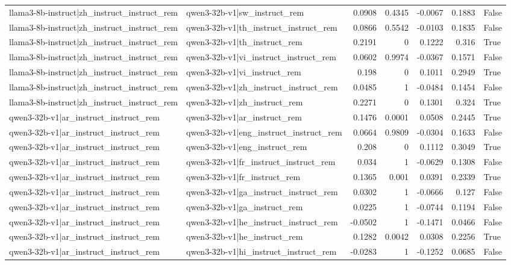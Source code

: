 \begin{table}
\begin{tabular}{l l r r r r l}
llama3-8b-instruct|zh_instruct_instruct_rem & qwen3-32b-v1|sw_instruct_rem & 0.0908 & 0.4345 & -0.0067 & 0.1883 & False \\
llama3-8b-instruct|zh_instruct_instruct_rem & qwen3-32b-v1|th_instruct_instruct_rem & 0.0866 & 0.5542 & -0.0103 & 0.1835 & False \\
llama3-8b-instruct|zh_instruct_instruct_rem & qwen3-32b-v1|th_instruct_rem & 0.2191 & 0 & 0.1222 & 0.316 & True \\
llama3-8b-instruct|zh_instruct_instruct_rem & qwen3-32b-v1|vi_instruct_instruct_rem & 0.0602 & 0.9974 & -0.0367 & 0.1571 & False \\
llama3-8b-instruct|zh_instruct_instruct_rem & qwen3-32b-v1|vi_instruct_rem & 0.198 & 0 & 0.1011 & 0.2949 & True \\
llama3-8b-instruct|zh_instruct_instruct_rem & qwen3-32b-v1|zh_instruct_instruct_rem & 0.0485 & 1 & -0.0484 & 0.1454 & False \\
llama3-8b-instruct|zh_instruct_instruct_rem & qwen3-32b-v1|zh_instruct_rem & 0.2271 & 0 & 0.1301 & 0.324 & True \\
qwen3-32b-v1|ar_instruct_instruct_rem & qwen3-32b-v1|ar_instruct_rem & 0.1476 & 0.0001 & 0.0508 & 0.2445 & True \\
qwen3-32b-v1|ar_instruct_instruct_rem & qwen3-32b-v1|eng_instruct_instruct_rem & 0.0664 & 0.9809 & -0.0304 & 0.1633 & False \\
qwen3-32b-v1|ar_instruct_instruct_rem & qwen3-32b-v1|eng_instruct_rem & 0.208 & 0 & 0.1112 & 0.3049 & True \\
qwen3-32b-v1|ar_instruct_instruct_rem & qwen3-32b-v1|fr_instruct_instruct_rem & 0.034 & 1 & -0.0629 & 0.1308 & False \\
qwen3-32b-v1|ar_instruct_instruct_rem & qwen3-32b-v1|fr_instruct_rem & 0.1365 & 0.001 & 0.0391 & 0.2339 & True \\
qwen3-32b-v1|ar_instruct_instruct_rem & qwen3-32b-v1|ga_instruct_instruct_rem & 0.0302 & 1 & -0.0666 & 0.127 & False \\
qwen3-32b-v1|ar_instruct_instruct_rem & qwen3-32b-v1|ga_instruct_rem & 0.0225 & 1 & -0.0744 & 0.1194 & False \\
qwen3-32b-v1|ar_instruct_instruct_rem & qwen3-32b-v1|he_instruct_instruct_rem & -0.0502 & 1 & -0.1471 & 0.0466 & False \\
qwen3-32b-v1|ar_instruct_instruct_rem & qwen3-32b-v1|he_instruct_rem & 0.1282 & 0.0042 & 0.0308 & 0.2256 & True \\
qwen3-32b-v1|ar_instruct_instruct_rem & qwen3-32b-v1|hi_instruct_instruct_rem & -0.0283 & 1 & -0.1252 & 0.0685 & False \\

\end{tabular}
\end{table}
